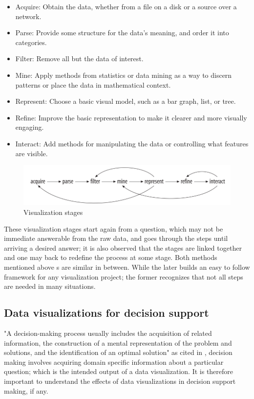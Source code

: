 \begin{displayquote}
	\begin{itemize}
\item Acquire: Obtain the data, whether from a file on a disk or a source over a network. 
\item Parse: Provide some structure for the data’s meaning, and order it into categories. 
\item Filter: Remove all but the data of interest. 
\item Mine: Apply methods from statistics or data mining as a way to discern patterns or place the data in mathematical context.
\item Represent: Choose a basic visual model, such as a bar graph, list, or tree. 
\item Refine: Improve the basic representation to make it clearer and more visually engaging. 
\item Interact: Add methods for manipulating the data or controlling what features are visible.
\end{itemize}
\end{displayquote}

\begin{figure}[!htb]
\begin{adjustbox}{width=1\textwidth,center=\textwidth}
  \centering
  \includegraphics[scale=1]{images/visualization_stages.png}
\end{adjustbox}
  \caption[Visualization stages \cite{Cleveland1993} ]{Visualization stages  \cite{Cleveland1993} }
  \label{fig:data_visualization_stages}
\end{figure}
These visualization stages start again from a question, which may not be immediate answerable from the raw data, and goes through the steps until arriving a desired answer; it is also observed that the stages are linked together and one may back to redefine the process at some stage. Both methods mentioned above s are similar in between. While the later builds an easy to follow framework for any visualization project; the former recognizes that not all steps are needed in many situations.

\subsection{Data visualizations for decision support}
"A decision-making process usually includes the acquisition of related information, the construction of a mental representation of the problem and solutions, and the identification of an optimal solution" \cite{carroll1987mental} as cited in \cite{Zhu2008}, decision making involves acquiring domain specific information about a particular question; which is the intended output of a data visualization. It is therefore important to understand the effects of data visualizations in decision support making, if any.

